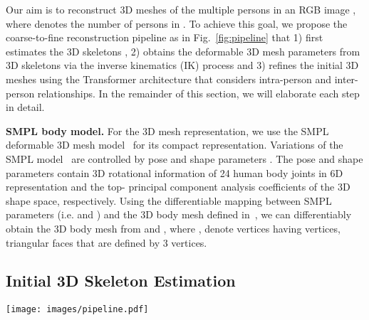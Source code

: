 \documentclass[runningheads]{llncs}
\begin{document}
Our aim is to reconstruct 3D meshes  of the multiple persons in an RGB image , where  denotes the number of persons in . To achieve this goal, we propose the coarse-to-fine reconstruction pipeline as in Fig.~\ref{fig:pipeline} that 1) first estimates the 3D skeletons , 2) obtains the deformable 3D mesh parameters from 3D skeletons via the inverse kinematics (IK) process and 3) refines the initial 3D meshes  using the Transformer architecture that considers intra-person and inter-person relationships. In the remainder of this section, we will elaborate each step in detail.

\noindent \textbf{SMPL body model.} For the 3D mesh representation, we use the SMPL deformable 3D mesh model~\cite{smpl} for its compact representation. Variations of the SMPL model~\cite{smpl} are controlled by pose  and shape parameters . The pose and shape parameters contain 3D rotational information of 24 human body joints in 6D representation and the top- principal component analysis coefficients of the 3D shape space, respectively. Using the differentiable mapping between SMPL parameters (i.e.  and ) and the 3D body mesh  defined in~\cite{smpl}, we can differentiably obtain the 3D body mesh  from  and , where ,  denote vertices having  vertices,  triangular faces that are defined by 3 vertices. 

\subsection{Initial 3D Skeleton Estimation}
\label{method:skeleton-estimation}
\begin{figure*}[t]
\centering
\texttt{[image: images/pipeline.pdf]}
\caption{The schematic diagram of our framework: We first detect persons from an image  and crop it to  and the image encoder extracts image features  from . Then, initial 3D skeletons  are estimated via the initial 3D skeleton estimator  and SMPL parameters  are reconstructed via the inverse kinematic process, involving the twist angle and shape estimator  (GAP denotes global average pooling layer). Finally, we refine the initial SMPL parameters by inputting the image features  and  to the relation-aware refiner  to produce the refined mesh parameters . The final 3D mesh  is obtained from the refined SMPL parameters . The blue boxes denote involved loss functions (, , ,  and ). } 
\label{fig:pipeline}
\end{figure*}
\end{document}
